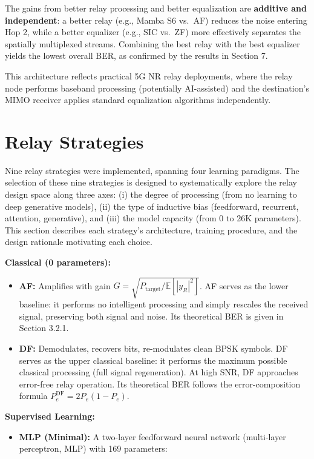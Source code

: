 \documentclass[
  english,
  12pt,
  12pt,
  a4paper,
  oneside]{report}
\providecommand{\tightlist}{%
  \setlength{\itemsep}{0pt}\setlength{\parskip}{0pt}}
\begin{document}
The gains from better relay processing and better equalization are \textbf{additive and independent}: a better relay (e.g., Mamba S6 vs.~AF) reduces the noise entering Hop 2, while a better equalizer (e.g., SIC vs.~ZF) more effectively separates the spatially multiplexed streams. Combining the best relay with the best equalizer yields the lowest overall BER, as confirmed by the results in Section 7.

This architecture reflects practical 5G NR relay deployments, where the relay node performs baseband processing (potentially AI-assisted) and the destination's MIMO receiver applies standard equalization algorithms independently.

\section{Relay Strategies}\label{sec:relay-strategies}

Nine relay strategies were implemented, spanning four learning paradigms. The selection of these nine strategies is designed to systematically explore the relay design space along three axes: (i) the degree of processing (from no learning to deep generative models), (ii) the type of inductive bias (feedforward, recurrent, attention, generative), and (iii) the model capacity (from 0 to 26K parameters). This section describes each strategy's architecture, training procedure, and the design rationale motivating each choice.

\textbf{Classical (0 parameters):}

\begin{itemize}
\item
  \textbf{AF:} Amplifies with gain \(G = \sqrt{P_{\text{target}} / \mathbb{E}[|y_R|^2]}\). AF serves as the lower baseline: it performs no intelligent processing and simply rescales the received signal, preserving both signal and noise. Its theoretical BER is given in Section 3.2.1.
\item
  \textbf{DF:} Demodulates, recovers bits, re-modulates clean BPSK symbols. DF serves as the upper classical baseline: it performs the maximum possible classical processing (full signal regeneration). At high SNR, DF approaches error-free relay operation. Its theoretical BER follows the error-composition formula \(P_e^{\text{DF}} = 2P_e(1-P_e)\).
\end{itemize}

\textbf{Supervised Learning:}

\begin{itemize}
\tightlist
\item
  \textbf{MLP (Minimal):} A two-layer feedforward neural network (multi-layer perceptron, MLP) with 169 parameters:
\end{itemize}
\end{document}
